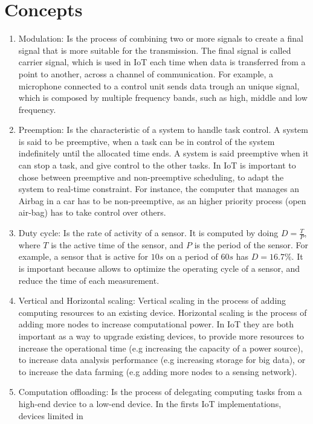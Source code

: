 \documentclass[acmsmall, screen,timestamp,nonacm]{acmart}
\begin{document}
\section{Concepts} %
\begin{enumerate}
	\item Modulation: Is the process of combining two or more signals to create a final
		signal that is more suitable for the transmission. The final signal is
		called carrier signal, which is used
		in IoT each time when data is transferred from a point to another, across 
		a channel of communication.
		For example, a microphone connected to a control unit sends data trough
		an unique signal, which is composed by
		multiple frequency bands, such as high, middle and low frequency. 
	\item Preemption: Is the characteristic of a system to handle task control. A system is
		said to be preemptive, when a task can be in control of the system
		indefinitely until the allocated time ends. A system is said preemptive
		when it can stop a task, and give control to the other tasks. In IoT is
		important to chose between preemptive and non-preemptive scheduling, to
		adapt the system to real-time constraint. For instance, the computer
		that manages an Airbag in a car has to be non-preemptive, as an higher
		priority process (open air-bag) has to take control over others.  
    \item Duty cycle: Is the rate of activity of a sensor. It is computed by doing $D =
		\frac{T}{P}$, where $T$ is the active time of the sensor, and
		$P$ is the period of the sensor. For example, a sensor that is active
		for $10s$ on a period of $60s$ has $D = 16.7\%$. It is important because
		allows to optimize the operating cycle of a sensor, and reduce the time
		of each measurement.
	\item Vertical and Horizontal scaling: Vertical scaling in the process of adding computing resources to an
		existing device. Horizontal scaling is the process of adding more nodes
		to increase computational power. In IoT they are both important as a way 
		to upgrade existing devices, to provide more resources to increase the operational time (e.g
		increasing the capacity of a power source), to increase data analysis
		performance (e.g increasing storage for big data), or to increase the
		data farming (e.g adding more nodes to a sensing network).
	\item Computation offloading: Is the process of delegating computing tasks from a high-end device to
		a low-end device. In the firsts IoT implementations, devices limited in

\end{enumerate}
\end{document}
